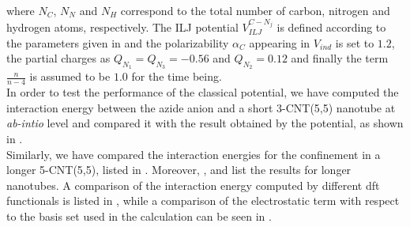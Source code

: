 \documentclass[utf8]{article}
\begin{document}
%
where $N_C$, $N_N$ and $N_H$ correspond to the total number of carbon, nitrogen and hydrogen atoms, respectively.
The ILJ potential $V_{ILJ}^{C-N_j}$ is defined according to the parameters given in  and the polarizability $\alpha_C$ appearing in $V_{ind}$ is set to $1.2$, the partial charges as $Q_{N_1} = Q_{N_3} = -0.56$ and $Q_{N_2} = 0.12$ and finally the term $\tfrac{n}{n - 4}$ is assumed to be $1.0$ for the time being.\\
In order to test the performance of the classical potential, we have computed the interaction energy between the azide anion and a short 3-CNT(5,5) nanotube at \textit{ab-intio} level and compared it with the result obtained by the potential, as shown in .\\
Similarly, we have compared the interaction energies for the confinement in a longer 5-CNT(5,5), listed in .
Moreover, ,  and  list the results for longer nanotubes.
A comparison of the interaction energy computed by different dft functionals is listed in , while a comparison of the electrostatic term with respect to the basis set used in the calculation can be seen in .
\end{document}

